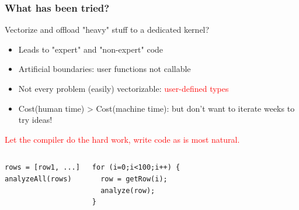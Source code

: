 \documentclass[16pt]{beamer}
\begin{document}
\begin{frame}[fragile]
\frametitle{What has been tried?}
\begin{center}
\Large{Vectorize and offload "heavy" stuff to a dedicated kernel?}
\end{center}

\begin{itemize}
\item Leads to "expert" and "non-expert" code
\item Artificial boundaries: user functions not callable
\item Not every problem (easily) vectorizable: \textcolor{red}{user-defined types}
\item Cost(human time) > Cost(machine time): but don't want to iterate weeks to try ideas!
\end{itemize}

\begin{center}
\textcolor{red}{Let the compiler do the hard work, write code as is most natural.}
\end{center}

\begin{columns}
\column[t]{5cm}

\centering{\textcolor{red}{vectorized}}
\begin{lstlisting}
rows = [row1, ...]
analyzeAll(rows)
\end{lstlisting}

\column[t]{5cm}
\centering{\textcolor{ForestGreen}{serial}}
\begin{lstlisting}
for (i=0;i<100;i++) {
  row = getRow(i);
  analyze(row);
}
\end{lstlisting}
\end{columns}

\end{frame}

\end{document}
